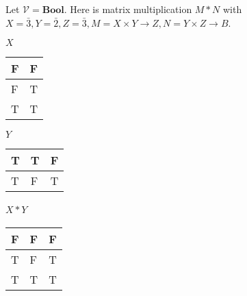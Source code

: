 
Let $\mathcal{V}=\mathbf{Bool}$. Here is matrix multiplication $M*N$ with $X=\bar{3}, Y=\bar{2},Z=\bar{3},M=X\times Y\rightarrow Z, N=Y\times Z\rightarrow B$.

$X$ \begin{minipage}{0.48\textwidth}

  \begin{tabular}{|l|l|}
    \hline
    F & F \\ \hline
    F & T \\ \hline
    T & T \\ \hline
  \end{tabular}
\end{minipage}


$Y$

\begin{minipage}{0.48\textwidth}

  \begin{tabular}{|l|l|l|}
    \hline
    T & T & F \\ \hline
    T & F & T \\ \hline
  \end{tabular}
\end{minipage}

$X*Y$
\,
\begin{minipage}{0.48\textwidth}
  \begin{tabular}{|l|l|l|}
    \hline
    F & F & F \\ \hline
    T & F & T \\ \hline
    T & T & T \\ \hline
  \end{tabular}
\end{minipage}\,